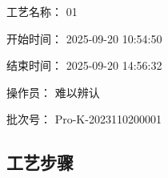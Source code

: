 \documentclass[UTF8,10pt,a4paper,fontset=fandol]{ctexart}
\newcommand{\fieldvalue}[1]{#1}
\newcommand{\handwritten}[1]{#1}
\begin{document}
\noindent
工艺名称：
\fieldvalue{01}

\noindent
开始时间：
\fieldvalue{2025-09-20 10:54:50}

\noindent
结束时间：
\fieldvalue{2025-09-20 14:56:32}

\noindent
操作员：
\fieldvalue{\handwritten{难以辨认}}

\noindent
批次号：
\fieldvalue{Pro-K-2023110200001}

\subsection{工艺步骤}
\end{document}
